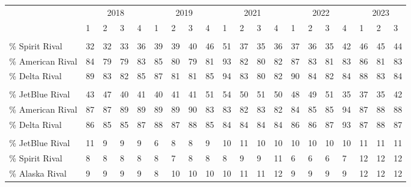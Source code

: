 
\begin{tabular}[t]{llllllllllllllllllll}
\toprule
\multicolumn{1}{c}{ } & \multicolumn{4}{c}{2018} & \multicolumn{4}{c}{2019} & \multicolumn{4}{c}{2021} & \multicolumn{4}{c}{2022} & \multicolumn{3}{c}{2023} \\
\cmidrule(l{3pt}r{3pt}){2-5} \cmidrule(l{3pt}r{3pt}){6-9} \cmidrule(l{3pt}r{3pt}){10-13} \cmidrule(l{3pt}r{3pt}){14-17} \cmidrule(l{3pt}r{3pt}){18-20}
 & 1 & 2 & 3 & 4 & 1 & 2 & 3 & 4 & 1 & 2 & 3 & 4 & 1 & 2 & 3 & 4 & 1 & 2 & 3\\
\midrule
\addlinespace[0.3em]
\multicolumn{20}{l}{\textbf{JetBlue}}\\
\hspace{1em}\% Spirit Rival & 32 & 32 & 33 & 36 & 39 & 39 & 40 & 46 & 51 & 37 & 35 & 36 & 37 & 36 & 35 & 42 & 46 & 45 & 44\\
\hspace{1em}\% American Rival & 84 & 79 & 79 & 83 & 85 & 80 & 79 & 81 & 93 & 82 & 80 & 82 & 87 & 83 & 81 & 83 & 86 & 81 & 83\\
\hspace{1em}\% Delta Rival & 89 & 83 & 82 & 85 & 87 & 81 & 81 & 85 & 94 & 83 & 80 & 82 & 90 & 84 & 82 & 84 & 88 & 83 & 84\\
\addlinespace[0.3em]
\multicolumn{20}{l}{\textbf{Spirit}}\\
\hspace{1em}\% JetBlue Rival & 43 & 47 & 40 & 41 & 40 & 41 & 41 & 51 & 54 & 50 & 51 & 50 & 48 & 49 & 51 & 35 & 37 & 35 & 42\\
\hspace{1em}\% American Rival & 87 & 87 & 89 & 89 & 89 & 89 & 90 & 83 & 83 & 82 & 83 & 82 & 84 & 85 & 85 & 94 & 87 & 88 & 88\\
\hspace{1em}\% Delta Rival & 86 & 85 & 85 & 87 & 88 & 87 & 88 & 85 & 84 & 84 & 84 & 84 & 86 & 86 & 87 & 93 & 87 & 88 & 87\\
\addlinespace[0.3em]
\multicolumn{20}{l}{\textbf{American}}\\
\hspace{1em}\% JetBlue Rival & 11 & 9 & 9 & 9 & 6 & 8 & 8 & 9 & 10 & 11 & 10 & 10 & 10 & 10 & 10 & 10 & 11 & 11 & 11\\
\hspace{1em}\% Spirit Rival & 8 & 8 & 8 & 8 & 8 & 7 & 8 & 8 & 8 & 9 & 9 & 11 & 6 & 6 & 6 & 7 & 12 & 12 & 12\\
\hspace{1em}\% Alaska Rival & 9 & 9 & 9 & 9 & 8 & 10 & 10 & 10 & 10 & 11 & 11 & 12 & 9 & 9 & 9 & 9 & 12 & 12 & 12\\

\end{tabular}

